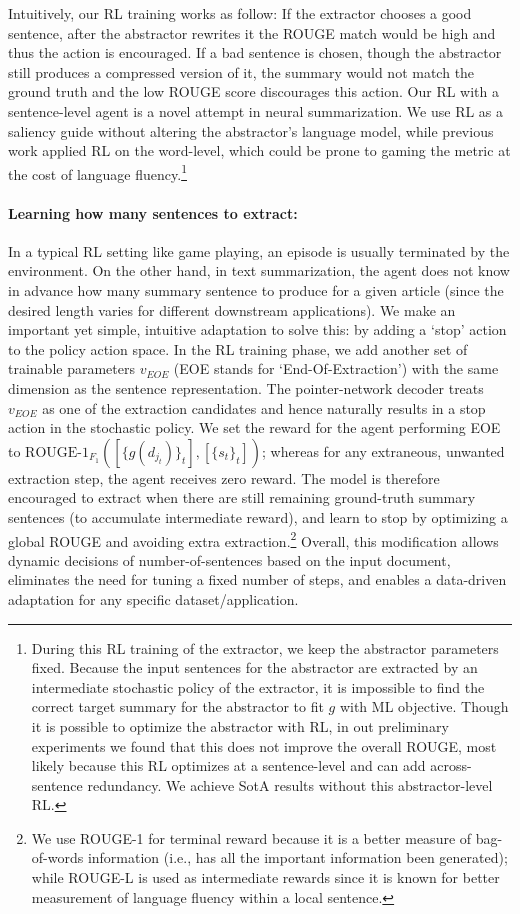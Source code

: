 \documentclass[11pt,a4paper]{article}
\begin{document}
Intuitively, our RL training works as follow:
If the extractor chooses a good sentence, after the abstractor rewrites it the ROUGE match would be high and thus the action is encouraged.
If a bad sentence is chosen, though the abstractor still produces a compressed version of it, the summary would not match the ground truth and the low ROUGE score discourages this action.
Our RL with a sentence-level agent is a novel attempt in neural summarization.
We use RL as a saliency guide without altering the abstractor's language model, while previous work applied RL on the word-level, which could be prone to gaming the metric at the cost of language fluency.\footnote{During this RL training of the extractor, we keep the abstractor parameters fixed. 
Because the input sentences for the abstractor are extracted by an intermediate stochastic policy of the extractor, it is impossible to find the correct target summary for the abstractor to fit $g$ with ML objective. 
Though it is possible to optimize the abstractor with RL, 
in out preliminary experiments we found that this does not improve the overall ROUGE, most likely because this RL optimizes at a sentence-level and can add across-sentence redundancy. We achieve SotA results without this abstractor-level RL.}


\paragraph{Learning how many sentences to extract:}
\label{sec:end-of-extract}
In a typical RL setting like game playing, an episode is usually terminated by the environment.
On the other hand, in text summarization, the agent does not know in advance how many summary sentence to produce for a given article (since the desired length varies for different downstream applications).
We make an important yet simple, intuitive adaptation to solve this: by adding a `stop' action to the policy action space.
In the RL training phase, we add another set of trainable parameters $v_{EOE}$ (EOE stands for `End-Of-Extraction') with the same dimension as the sentence representation.
The pointer-network decoder treats $v_{EOE}$ as one of the extraction candidates and hence naturally results in a stop action in the stochastic policy.
We set the reward for the agent performing EOE to 
$\text{ROUGE-1}_{F_1}([\{g(d_{j_t})\}_t], [\{s_t\}_t])$; whereas for any extraneous, unwanted extraction step, the agent receives zero reward.
The model is therefore encouraged to extract when there are still remaining ground-truth summary sentences (to accumulate intermediate reward),
and learn to stop by optimizing a global ROUGE and avoiding extra extraction.\footnote{We use ROUGE-1 for terminal reward because it is a better measure of bag-of-words information
(i.e., has all the important information been generated);
while ROUGE-L is used as intermediate rewards since it is known for better measurement of language fluency within a local sentence.}
Overall, this modification allows dynamic decisions of number-of-sentences based on the input document, eliminates the need for tuning a fixed number of steps, and enables a data-driven adaptation for any specific dataset/application.
\end{document}
